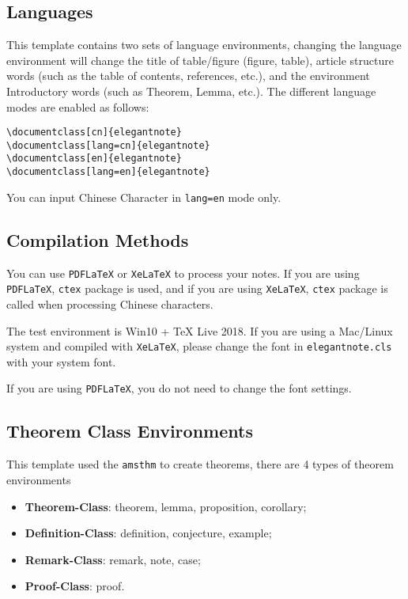\documentclass[en,geye,green,screen,14pt]{elegantnote}
\begin{document}
\subsection{Languages}
This template contains two sets of language environments, changing the language environment will change the title of table/figure (figure, table), article structure words (such as the table of contents, references, etc.), and the environment Introductory words (such as Theorem, Lemma, etc.). The different language modes are enabled as follows:
\begin{lstlisting}[frame=none]  
\documentclass[cn]{elegantnote}
\documentclass[lang=cn]{elegantnote}
\documentclass[en]{elegantnote}
\documentclass[lang=en]{elegantnote}
\end{lstlisting}
\begin{note}
You can input Chinese Character in \lstinline{lang=en} mode only.
\end{note}

\subsection{Compilation Methods}

You can use \lstinline{PDFLaTeX} or \lstinline{XeLaTeX} to process your notes. If you are using \lstinline{PDFLaTeX}, \lstinline{ctex} package is used, and if you are using \lstinline{XeLaTeX}, \lstinline{ctex} package is called when processing Chinese characters. 

The test environment is Win10 + \TeX{} Live 2018. If you are using a Mac/Linux system and compiled with \lstinline{XeLaTeX},  please change the font in \lstinline{elegantnote.cls} with your system font.

\begin{note}
If you are using \lstinline{PDFLaTeX}, you do not need to change the font settings.
\end{note}

\subsection{Theorem Class Environments}
This template used the \lstinline{amsthm} to create theorems, there are 4 types of theorem environments
\begin{itemize}
\item \textbf{Theorem-Class}: theorem, lemma, proposition, corollary;
\item \textbf{Definition-Class}: definition, conjecture, example;
\item \textbf{Remark-Class}: remark, note, case;
\item \textbf{Proof-Class}: proof.
\end{itemize}
\end{document}
